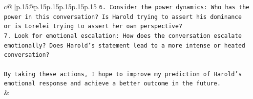 \documentclass{article}
\begin{document}
{\begin{supertabular}{c@{$\;$}|p{.15\linewidth}@{}p{.15\linewidth}p{.15\linewidth}p{.15\linewidth}p{.15\linewidth}p{.15\linewidth}}
{{{\texttt{6. Consider the power dynamics: Who has the power in this conversation? Is Harold trying to assert his dominance or is Lorelei trying to assert her own perspective?} \\
\texttt{7. Look for emotional escalation: How does the conversation escalate emotionally? Does Harold's statement lead to a more intense or heated conversation?} \\
\\ 
\texttt{By taking these actions, I hope to improve my prediction of Harold's emotional response and achieve a better outcome in the future.} \\
            }
        }
    }
    & \\ \\

\end{supertabular}
}
\end{document}

